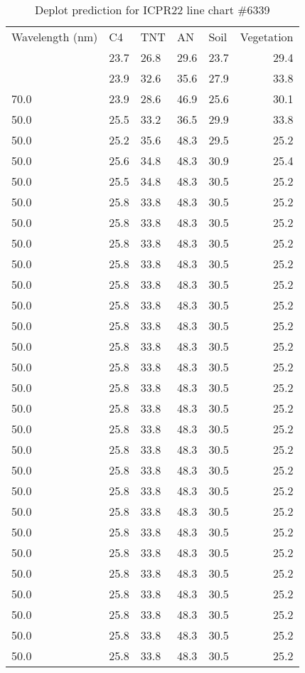 \begin{table}
    \begin{tabular}{lllllr}
Wavelength (nm) & C4 & TNT & AN & Soil & Vegetation \\
& 23.7 & 26.8 & 29.6 & 23.7 & 29.4 \\
& 23.9 & 32.6 & 35.6 & 27.9 & 33.8 \\
70.0 & 23.9 & 28.6 & 46.9 & 25.6 & 30.1 \\
50.0 & 25.5 & 33.2 & 36.5 & 29.9 & 33.8 \\
50.0 & 25.2 & 35.6 & 48.3 & 29.5 & 25.2 \\
50.0 & 25.6 & 34.8 & 48.3 & 30.9 & 25.4 \\
50.0 & 25.5 & 34.8 & 48.3 & 30.5 & 25.2 \\
50.0 & 25.8 & 33.8 & 48.3 & 30.5 & 25.2 \\
50.0 & 25.8 & 33.8 & 48.3 & 30.5 & 25.2 \\
50.0 & 25.8 & 33.8 & 48.3 & 30.5 & 25.2 \\
50.0 & 25.8 & 33.8 & 48.3 & 30.5 & 25.2 \\
50.0 & 25.8 & 33.8 & 48.3 & 30.5 & 25.2 \\
50.0 & 25.8 & 33.8 & 48.3 & 30.5 & 25.2 \\
50.0 & 25.8 & 33.8 & 48.3 & 30.5 & 25.2 \\
50.0 & 25.8 & 33.8 & 48.3 & 30.5 & 25.2 \\
50.0 & 25.8 & 33.8 & 48.3 & 30.5 & 25.2 \\
50.0 & 25.8 & 33.8 & 48.3 & 30.5 & 25.2 \\
50.0 & 25.8 & 33.8 & 48.3 & 30.5 & 25.2 \\
50.0 & 25.8 & 33.8 & 48.3 & 30.5 & 25.2 \\
50.0 & 25.8 & 33.8 & 48.3 & 30.5 & 25.2 \\
50.0 & 25.8 & 33.8 & 48.3 & 30.5 & 25.2 \\
50.0 & 25.8 & 33.8 & 48.3 & 30.5 & 25.2 \\
50.0 & 25.8 & 33.8 & 48.3 & 30.5 & 25.2 \\
50.0 & 25.8 & 33.8 & 48.3 & 30.5 & 25.2 \\
50.0 & 25.8 & 33.8 & 48.3 & 30.5 & 25.2 \\
50.0 & 25.8 & 33.8 & 48.3 & 30.5 & 25.2 \\
50.0 & 25.8 & 33.8 & 48.3 & 30.5 & 25.2 \\
50.0 & 25.8 & 33.8 & 48.3 & 30.5 & 25.2 \\
50.0 & 25.8 & 33.8 & 48.3 & 30.5 & 25.2 \\
50.0 & 25.8 & 33.8 & 48.3 & 30.5 & 25.2 \\
\end{tabular}
    \caption{Deplot prediction for ICPR22 line chart \#6339}
    \label{tab:deplot-icpr22-line-6339}
\end{table}
